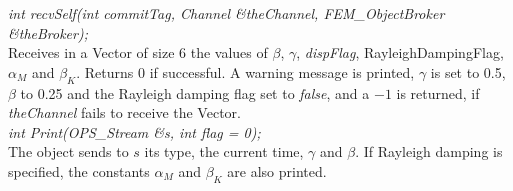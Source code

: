 {\em int recvSelf(int commitTag, Channel \&theChannel, 
FEM\_ObjectBroker \&theBroker); } \\ 
Receives in a Vector of size 6 the values of $\beta$, $\gamma$, {\em
dispFlag}, RayleighDampingFlag, $\alpha_M$ and $\beta_K$. Returns $0$
if successful. A warning message is printed, $\gamma$ is set to 0.5,
$\beta$ to 0.25 and the Rayleigh damping flag set to {\em false}, and
a $-1$ is returned, if {\em theChannel} fails to receive the Vector.\\ 

{\em int Print(OPS\_Stream \&s, int flag = 0);}\\
The object sends to $s$ its type, the current time, $\gamma$ and
$\beta$. If Rayleigh damping is specified, the constants $\alpha_M$ and
$\beta_K$ are also printed.






